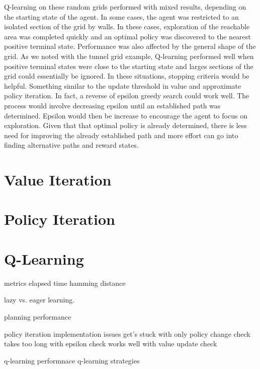 \documentclass{sig-alternate}
\begin{document}
Q-learning on these random grids performed with mixed results, depending on the starting state of the agent. In some cases, the agent was restricted to an isolated section of the grid by walls. In these cases, exploration of the reachable area was completed quickly and an optimal policy was discovered to the nearest positive terminal state. Performance was also affected by the general shape of the grid. As we noted with the tunnel grid example, Q-learning performed well when positive terminal states were close to the starting state and larges sections of the grid could essentially be ignored. In these situations, stopping criteria would be helpful. Something similar to the update threshold in value and approximate policy iteration. In fact, a reverse of epsilon greedy search could work well. The process would involve decreasing epsilon until an established path was determined. Epsilon would then be increase to encourage the agent to focus on exploration. Given that that optimal policy is already determined, there is less need for improving the already established path and more effort can go into finding alternative paths and reward states.


\section{Value Iteration}


\section{Policy Iteration}

\section{Q-Learning}

metrics
    elapsed time
    hamming distance

lazy vs. eager learning.

planning performance

policy iteration implementation issues
    get's stuck with only policy change check
    takes too long with epsilon check
    works well with value update check


q-learning performnace
q-learning strategies










\end{document}
